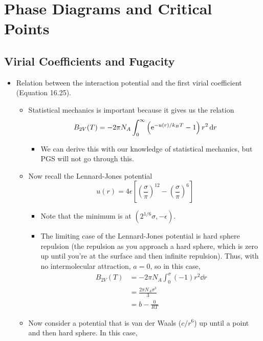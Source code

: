 \documentclass[../notes.tex]{subfiles}
\begin{document}
\chapter{Phase Diagrams and Critical Points}
\section{Virial Coefficients and Fugacity}
\begin{itemize}
    \item {}Relation between the interaction potential and the first virial coefficient (Equation 16.25).
    \begin{itemize}
        \item Statistical mechanics is important because it gives us the relation
        \begin{equation*}
            B_{2V}(T) = -2\pi N_A\int_0^\infty\left( \e[-u(r)/k_BT]-1 \right)r^2\dd{r}
        \end{equation*}
        \begin{itemize}
            \item We can derive this with our knowledge of statistical mechanics, but PGS will not go through this.
        \end{itemize}
        \item Now recall the Lennard-Jones potential
        \begin{equation*}
            u(r) = 4\epsilon\left[ \left( \frac{\sigma}{\pi} \right)^{12}-\left( \frac{\sigma}{\pi} \right)^6 \right]
        \end{equation*}
        \begin{itemize}
            \item Note that the minimum is at $(2^{1/6}\sigma,-\epsilon)$.
            \item The limiting case of the Lennard-Jones potential is hard sphere repulsion (the repulsion as you approach a hard sphere, which is zero up until you're at the surface and then infinite repulsion). Thus, with no intermolecular attraction, $a=0$, so in this case,
            \begin{align*}
                B_{2V}(T) &= -2\pi N_A\int_0^\sigma(-1)r^2\dd{r}\\
                &= \frac{2\pi N_A\sigma^3}{3}\\
                &= b-\frac{0}{RT}
            \end{align*}
        \end{itemize}
        \item Now consider a potential that is van der Waals ($c/r^6$) up until a point and then hard sphere. In this case,

\end{itemize}
\end{itemize}
\end{document}
